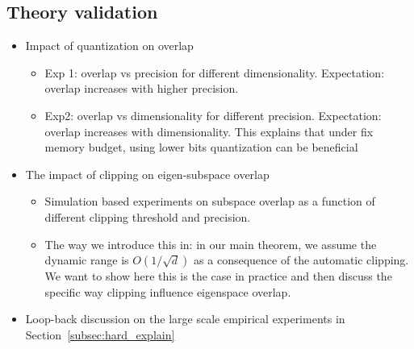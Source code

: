 \subsection{Theory validation}
	\begin{itemize}
		\item Impact of quantization on overlap 
			\begin{itemize}
 				\item Exp 1: overlap vs precision for different dimensionality. Expectation: overlap increases with higher precision.
				\item Exp2: overlap vs dimensionality for different precision. Expectation: overlap increases with dimensionality. This explains that under fix memory budget, using lower bits quantization can be beneficial
			\end{itemize}
		\item The impact of clipping on eigen-subspace overlap
			\begin{itemize}
				\item Simulation based experiments on subspace overlap as a function of different clipping threshold and precision. 
				\item The way we introduce this in: in our main theorem, we assume the dynamic range is $O(1/\sqrt{d})$ as a consequence of the automatic clipping. We want to show here this is the case in practice and then discuss the specific way clipping influence eigenspace overlap.
			\end{itemize}
		\item Loop-back discussion on the large scale empirical experiments in Section~\ref{subsec:hard_explain}
	\end{itemize}

